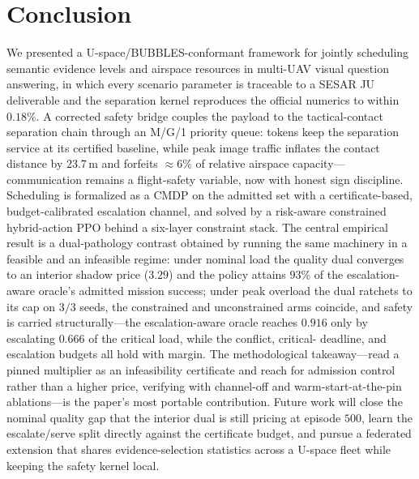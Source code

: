 \section{Conclusion}\label{sec:conclusion}

We presented a U-space/BUBBLES-conformant framework for jointly scheduling
semantic evidence levels and airspace resources in multi-UAV visual
question answering, in which every scenario parameter is traceable to a
SESAR JU deliverable and the separation kernel reproduces the official
numerics to within $0.18\%$. A corrected safety bridge couples the payload
to the tactical-contact separation chain through an M/G/1 priority queue:
tokens keep the separation service at its certified baseline, while peak
image traffic inflates the contact distance by $23.7$\,m and forfeits
$\approx\!6\%$ of relative airspace capacity---communication remains a
flight-safety variable, now with honest sign discipline. Scheduling is
formalized as a CMDP on the admitted set with a certificate-based,
budget-calibrated escalation channel, and solved by a risk-aware
constrained hybrid-action PPO behind a six-layer constraint stack. The
central empirical result is a dual-pathology contrast obtained by running
the same machinery in a feasible and an infeasible regime: under nominal
load the quality dual converges to an interior shadow price ($3.29$) and
the policy attains $93\%$ of the escalation-aware oracle's admitted
mission success; under peak overload the dual ratchets to its cap on
$3/3$ seeds, the constrained and unconstrained arms coincide, and safety
is carried structurally---the escalation-aware oracle reaches $0.916$ only
by escalating $0.666$ of the critical load, while the conflict, critical-
deadline, and escalation budgets all hold with margin. The methodological
takeaway---read a pinned multiplier as an infeasibility certificate and
reach for admission control rather than a higher price, verifying with
channel-off and warm-start-at-the-pin ablations---is the paper's most
portable contribution. Future work will close the nominal quality gap
that the interior dual is still pricing at episode $500$, learn the
escalate/serve split directly against the certificate budget, and pursue
a federated extension that shares evidence-selection statistics across a
U-space fleet while keeping the safety kernel local.
